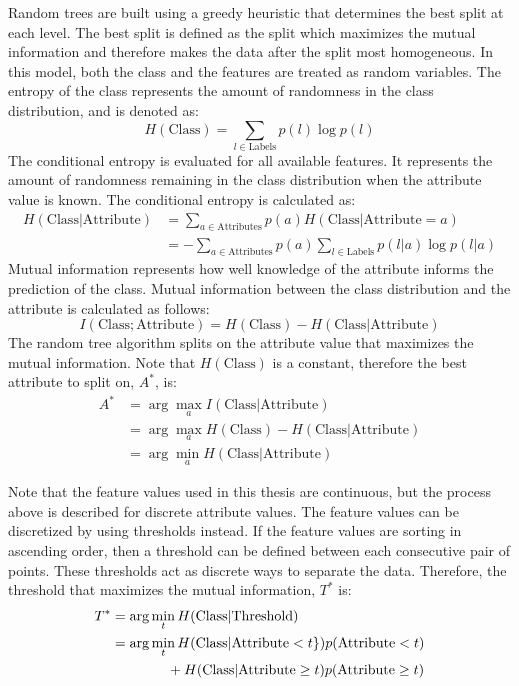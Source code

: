 \documentclass[12pt]{report}
\begin{document}
Random trees are built using a greedy heuristic that determines the best split at each level.
The best split is defined as the split which maximizes the mutual information and therefore makes the data after the split most homogeneous.
In this model, both the class and the features are treated as random variables.
The entropy of the class represents the amount of randomness in the class distribution, and is denoted as:
\begin{equation}
H(\text{Class})=\sum_{l\in \text{Labels}} p(l)\log p(l)
\end{equation}
The conditional entropy is evaluated for all available features.  
It represents the amount of randomness remaining in the class distribution when the attribute value is known.
The conditional entropy is calculated as:
\begin{align}
H(\text{Class}|\text{Attribute}) &= \sum_{a\in \text{Attributes}}p(a)H(\text{Class}|\text{Attribute}=a) \\
&=  -\sum_{a\in\text{Attributes}}p(a)\sum_{l\in\text{Labels}}p(l|a)\log p(l|a)
\end{align}
Mutual information represents how well knowledge of the attribute informs the prediction of the class.
Mutual information between the class distribution and the attribute is calculated as follows:
\begin{equation}
I(\text{Class}; \text{Attribute}) = H(\text{Class}) - H(\text{Class} | \text{Attribute})
\end{equation} \label{eq:info_gained}
The random tree algorithm splits on the attribute value that maximizes the mutual information.
Note that $H(\text{Class})$ is a constant, therefore the best attribute to split on, $A^*$, is:
\begin{align}
A^* &= \arg\max_a I(\text{Class}|\text{Attribute}) \\
&= \arg \max_a H(\text{Class})-H(\text{Class}|\text{Attribute})\\
&= \arg\min_a H(\text{Class}|\text{Attribute})
\end{align}

Note that the feature values used in this thesis are continuous, but the process above is described for discrete attribute values.
The feature values can be discretized by using thresholds instead.
If the feature values are sorting in ascending order, then a threshold can be defined between each consecutive pair of points.
These thresholds act as discrete ways to separate the data.
Therefore, the threshold that maximizes the mutual information, $T^*$ is:
\begin{align}
T^* &= \arg\min_t H(\text{Class}|\text{Threshold})\\
&= \arg\min_t H(\text{Class}|\text{Attribute}<t\})p(\text{Attribute}<t) \notag \\
 &\qquad \qquad + H(\text{Class}|\text{Attribute}\geq t)p(\text{Attribute}\geq t)
\end{align}
\end{document}
